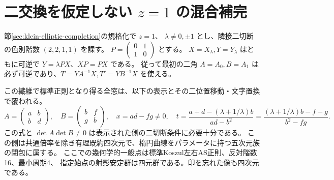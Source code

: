 \section{二交換を仮定しない $z=1$ の混合補完}
\label{sec:klein-mixed-exchange-resolution}
節\ref{sec:klein-elliptic-completion}の規格化で $z=1$、
$\lambda\ne0,\pm1$ とし、隣接二切断の色別階数 $(2,2,1,1)$ を課す。
$P=\left(\begin{smallmatrix}0&1\\1&0\end{smallmatrix}\right)$ とする。
$X=X_\lambda,Y=Y_\lambda$ はともに可逆で $Y=\lambda PX$、$XP=PX$ である。
従って最初の二角 $A=A_0,B=A_1$ は必ず可逆であり、$T=YA^{-1}X,T'=YB^{-1}X$ を使える。
\begin{theorem}\label{thm:klein-mixed-exchange-resolution}
この繊維で標準正則となり得る全窓は、以下の表示とその二位置移動・文字置換で覆われる。
\[
 A=\begin{pmatrix}a&b\\b&d\end{pmatrix},\quad
 B=\begin{pmatrix}b&f\\g&b\end{pmatrix},\quad
 x=ad-fg\ne0,\quad t=\frac{a+d-(\lambda+1/\lambda)b}{ad-b^2}
   =\frac{(\lambda+1/\lambda)b-f-g}{b^2-fg}.
\]
この式と $\det A\det B\ne0$ は表示された側の二切断条件に必要十分である。
この側は共通倍率を除き有理既約四次元で、楕円曲線をパラメータに持つ五次元族の閉包に属する。
ここでの幾何学的一般点は標準Koszul左右AS正則、反対階数16、最小周期4、
指定始点の射影安定群は四元群である。印を忘れた像も四次元である。
\end{theorem}
